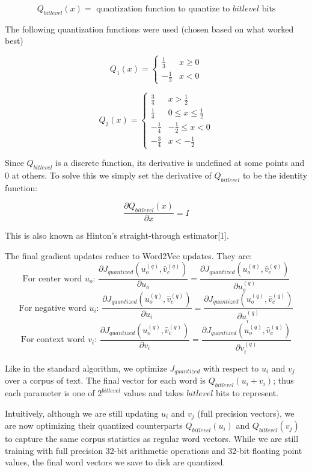 \documentclass{article} %
\begin{document}
$$
Q_{bitlevel}(x) = \mbox{ quantization function to quantize to } bitlevel \mbox{ bits}
$$

The following quantization functions were used (chosen based on what worked best)

\[
Q_1(x) =
\begin{cases}
  \frac{1}{3} & x \geq 0\\
  -\frac{1}{3} & x < 0
\end{cases}
\]


\[
Q_2(x) =
\begin{cases}
  \frac{3}{4} & x > \frac{1}{2}\\
  \frac{1}{4} & 0 \leq x \leq \frac{1}{2}\\
  -\frac{1}{4} & -\frac{1}{2} \leq x < 0\\
  -\frac{3}{4} & x < -\frac{1}{2}
\end{cases}
\]

Since $Q_{bitlevel}$ is a discrete function, its derivative is
undefined at some points and 0 at others. To solve this we simply set
the derivative of $Q_{bitlevel}$ to be the identity function:

$$
\frac{\partial Q_{bitlevel}(x)}{\partial x} = I
$$

This is also known as Hinton's straight-through estimator[1].

The final gradient updates reduce to Word2Vec updates. They are:
$$
\mbox{For center word } u_o \textbf{: } \frac{\partial J_{quantized} (u^{(q)}_o, \hat{v}^{(q)}_c)}{\partial u_o} = \frac{\partial J_{quantized} (u^{(q)}_o, \hat{v}^{(q)}_c)}{\partial u^{(q)}_o}
$$
$$
\mbox{For negative word } u_i \textbf{: } \frac{\partial J_{quantized} (u^{(q)}_o, \hat{v}^{(q)}_c)}{\partial u_i} = \frac{\partial J_{quantized} (u^{(q)}_o, \hat{v}^{(q)}_c)}{\partial u^{(q)}_i}
$$
$$
\mbox{For context word } v_i \textbf{: } \frac{\partial J_{quantized} (u^{(q)}_o, \hat{v}^{(q)}_c)}{\partial v_i} = \frac{\partial J_{quantized} (u^{(q)}_o, \hat{v}^{(q)}_c)}{\partial v^{(q)}_i}
$$

Like in the standard algorithm, we optimize $J_{quantized}$ with
respect to $u_i$ and $v_j$ over a corpus of text. The final vector for
each word is $Q_{bitlevel}(u_i + v_i)$; thus each parameter is one of
$2^{bitlevel}$ values and takes $bitlevel$ bits to represent.

Intuitively, although we are still updating $u_i$ and $v_j$ (full
precision vectors), we are now optimizing their quantized
counterparts $Q_{bitlevel}(u_i)$ and $Q_{bitlevel}(v_j)$ to capture
the same corpus statistics as regular word vectors. While we are still
training with full precision 32-bit arithmetic operations and 32-bit floating
point values, the final word vectors we save to disk are
quantized.
\end{document}
